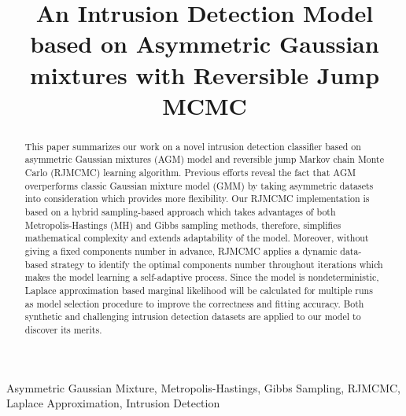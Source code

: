 \documentclass[conference]{IEEEtran}
\begin{document}
\title{An Intrusion Detection Model based on Asymmetric Gaussian mixtures with Reversible Jump MCMC\\
}

\author{
\and
{}
}

\maketitle

\begin{abstract}
This paper summarizes our work on a novel intrusion detection classifier based on asymmetric Gaussian mixtures (AGM) model and reversible jump Markov chain Monte Carlo (RJMCMC) learning algorithm. Previous efforts reveal the fact that AGM overperforms classic Gaussian mixture model (GMM) by taking asymmetric datasets into consideration which provides more flexibility. Our RJMCMC implementation is based on a hybrid sampling-based approach which takes advantages of both Metropolis-Hastings (MH) and Gibbs sampling methods, therefore, simplifies mathematical complexity and extends adaptability of the model. Moreover, without giving a fixed components number in advance, RJMCMC applies a dynamic data-based strategy to identify the optimal components number throughout iterations which makes the model learning a self-adaptive process. Since the model is nondeterministic, Laplace approximation based marginal likelihood will be calculated for multiple runs as model selection procedure to improve the correctness and fitting accuracy. Both synthetic and challenging intrusion detection datasets are applied to our model to discover its merits.
\end{abstract}

\begin{IEEEkeywords}
Asymmetric Gaussian Mixture, Metropolis-Hastings, Gibbs Sampling, RJMCMC, Laplace Approximation, Intrusion Detection
\end{IEEEkeywords}
\end{document}

